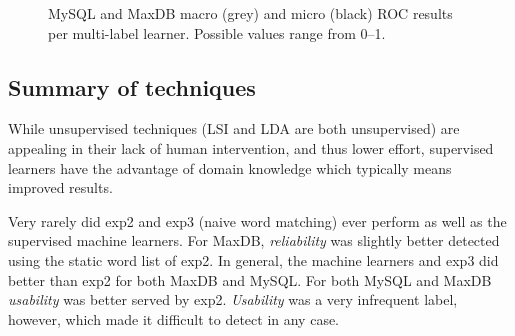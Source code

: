 \documentclass[]{sig-alternate}
\begin{document}
\begin{figure}[ht]
\centering
{}
\label{fig:mulan}
\caption[]{MySQL and MaxDB macro (grey) and micro (black) ROC results per multi-label learner. Possible values range from 0--1.
}
\end{figure}

\subsection{Summary of techniques}
While unsupervised techniques (LSI and LDA are both unsupervised) are appealing in their lack of human intervention, and thus lower effort, supervised learners have the advantage of domain knowledge which typically means improved results.

Very rarely did \textsf{exp2} and \textsf{exp3} (naive word matching) ever perform as well as the supervised machine learners. For MaxDB, \textit{reliability} was slightly better detected using the static word list of \textsf{exp2}. In general, the machine learners and \textsf{exp3} did better than \textsf{exp2} for both MaxDB and MySQL. For both MySQL and MaxDB \textit{usability} was better served by \textsf{exp2}. \textit{Usability} was a very infrequent label, however, which made it difficult to detect in any case.
\end{document}
